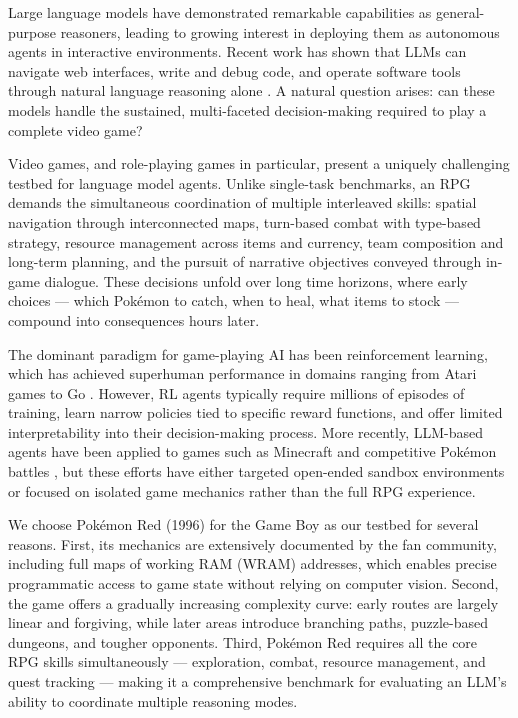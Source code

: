 \documentclass{article}
\begin{document}
Large language models have demonstrated remarkable capabilities as general-purpose reasoners, leading to growing interest in deploying them as autonomous agents in interactive environments. Recent work has shown that LLMs can navigate web interfaces, write and debug code, and operate software tools through natural language reasoning alone \citep{xi2023rise, wang2024survey}. A natural question arises: can these models handle the sustained, multi-faceted decision-making required to play a complete video game?

Video games, and role-playing games in particular, present a uniquely challenging testbed for language model agents. Unlike single-task benchmarks, an RPG demands the simultaneous coordination of multiple interleaved skills: spatial navigation through interconnected maps, turn-based combat with type-based strategy, resource management across items and currency, team composition and long-term planning, and the pursuit of narrative objectives conveyed through in-game dialogue. These decisions unfold over long time horizons, where early choices --- which Pok\'{e}mon to catch, when to heal, what items to stock --- compound into consequences hours later.

The dominant paradigm for game-playing AI has been reinforcement learning, which has achieved superhuman performance in domains ranging from Atari games \citep{mnih2015human} to Go \citep{silver2016mastering}. However, RL agents typically require millions of episodes of training, learn narrow policies tied to specific reward functions, and offer limited interpretability into their decision-making process. More recently, LLM-based agents have been applied to games such as Minecraft \citep{wang2023voyager} and competitive Pok\'{e}mon battles \citep{hu2024pokellmon}, but these efforts have either targeted open-ended sandbox environments or focused on isolated game mechanics rather than the full RPG experience.

We choose Pok\'{e}mon Red (1996) for the Game Boy as our testbed for several reasons. First, its mechanics are extensively documented by the fan community, including full maps of working RAM (WRAM) addresses, which enables precise programmatic access to game state without relying on computer vision. Second, the game offers a gradually increasing complexity curve: early routes are largely linear and forgiving, while later areas introduce branching paths, puzzle-based dungeons, and tougher opponents. Third, Pok\'{e}mon Red requires all the core RPG skills simultaneously --- exploration, combat, resource management, and quest tracking --- making it a comprehensive benchmark for evaluating an LLM's ability to coordinate multiple reasoning modes.
\end{document}
